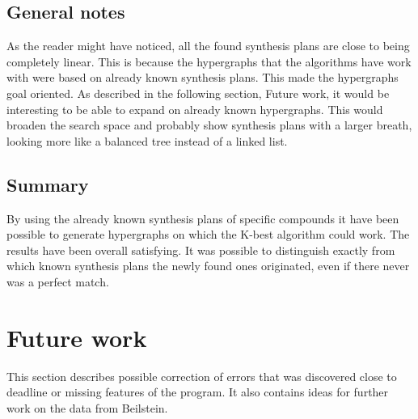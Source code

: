 \documentclass[a4paper,10pt,titlepage]{paper}
\begin{document}
\subsection{General notes}
As the reader might have noticed, all the found synthesis plans are close to being completely linear. This is because the hypergraphs that the algorithms have work with were based on already known synthesis plans. This made the hypergraphs goal oriented. As described in the following section, Future work, it would be interesting to be able to expand on already known hypergraphs. This would broaden the search space and probably show synthesis plans with a larger breath, looking more like a balanced tree instead of a linked list.

\subsection{Summary}
By using the already known synthesis plans of specific compounds it have been possible to generate hypergraphs on which the K-best algorithm could work. The results have been overall satisfying. It was possible to distinguish exactly from which known synthesis plans the newly found ones originated, even if there never was a perfect match. 

\section{Future work}
\label{sec::FutureWork}
This section describes possible correction of errors that was discovered close to deadline or missing features of the program. It also contains ideas for further work on the data from Beilstein.
\end{document}

